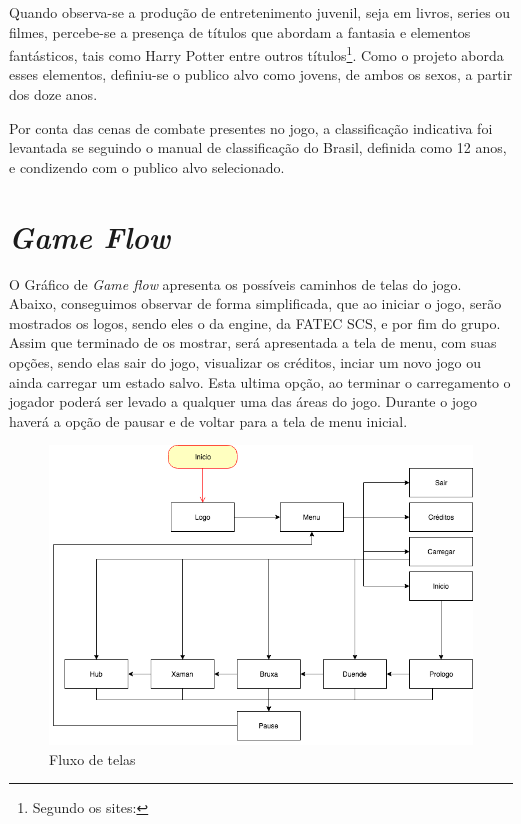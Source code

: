 Quando observa-se a produção de entretenimento juvenil, seja em livros, series ou filmes, percebe-se a presença de títulos que abordam a fantasia e elementos fantásticos, tais como Harry Potter entre outros títulos\footnote{Segundo os sites: }. Como o projeto aborda esses elementos, definiu-se o publico alvo como jovens, de ambos os sexos, a partir dos doze anos.

Por conta das cenas de combate presentes no jogo, a classificação indicativa foi levantada se seguindo o manual de classificação do Brasil\cite{classificacao}, definida como 12 anos, e condizendo com o publico alvo selecionado.

\section{\textit{Game Flow}}

O Gráfico de \textit{Game flow} apresenta os possíveis caminhos de telas do jogo. Abaixo, conseguimos observar de forma simplificada, que ao iniciar o jogo, serão mostrados os logos, sendo eles o da engine, da FATEC SCS, e por fim do grupo. Assim que terminado de os mostrar, será apresentada a tela de menu, com suas opções, sendo elas sair do jogo, visualizar os créditos, inciar um novo jogo ou ainda carregar um estado salvo. Esta ultima opção, ao terminar o carregamento o jogador poderá ser levado a qualquer uma das áreas do jogo.
Durante o jogo haverá a opção de pausar e de voltar para a tela de menu inicial.

\clearpage

\begin{figure}[!htb]
    \caption{\label{fig_grafico}Fluxo de telas} \begin{center}
    \includegraphics[width=\textwidth]{imagens/Flow.png} \end{center}
 \end{figure}



